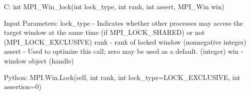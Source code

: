 C:
int MPI_Win_lock(int lock_type, int rank, int assert, MPI_Win win)

Input Parameters:
lock_type - Indicates whether other processes may access the target window at the
    same time (if MPI_LOCK_SHARED) or not (MPI_LOCK_EXCLUSIVE)
rank - rank of locked window (nonnegative integer)
assert - Used to optimize this call; zero may be used as a default. (integer)
win - window object (handle)

Python:
MPI.Win.Lock(self,
    int rank, int lock_type=LOCK_EXCLUSIVE, int assertion=0)
